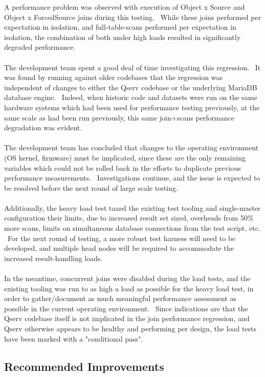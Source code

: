 \documentclass[DM,lsstdraft,STR,toc]{lsstdoc}
\begin{document}
A performance problem was observed with execution of Object x Source and
Object x ForcedSource joins during this testing. ~While these joins
performed per expectation in isolation, and full-table-scans performed
per expectation in isolation, the combination of both under high loads
resulted in significantly degraded performance.\\
~\\
The development team spent a good deal of time investigating this
regression. ~It was found by running against older codebases that the
regression was independent of changes to either the Qserv codebase or
the underlying MariaDB database engine. ~Indeed, when historic code and
datasets were run on the same hardware systems which had been used for
performance testing previously, at the same scale as had been run
previously, this same join+scans performance degradation was evident.\\
~\\
The development team has concluded that changes to the operating
environment (OS kernel, firmware) must be implicated, since these are
the only remaining variables which could not be rolled back in the
efforts to duplicate previous performance measurements. ~Investigations
continue, and the issue is expected to be resolved before the next round
of large scale testing.\\
~\\
Additionally, the heavy load test taxed the existing test tooling and
single-master configuration their limits, due to increased result set
sized, overheads from 50\% more scans, limits on simultaneous database
connections from the test script, etc. ~For the next round of testing, a
more robust test harness will need to be developed, and multiple head
nodes will be required to accommodate the increased result-handling
loads.\\
~\\
In the meantime, concurrent joins were disabled during the load tests,
and the existing tooling was run to as high a load as possible for the
heavy load test, in order to gather/document as much meaningful
performance assessment as possible in the current operating environment.
~Since indications are that the Qserv codebase itself is not implicated
in the join performance regression, and Qserv otherwise appears to be
healthy and performing per design, the load tests have been marked with
a "conditional pass".


\subsection{Recommended Improvements}
\label{sect:recommendations}
\end{document}
